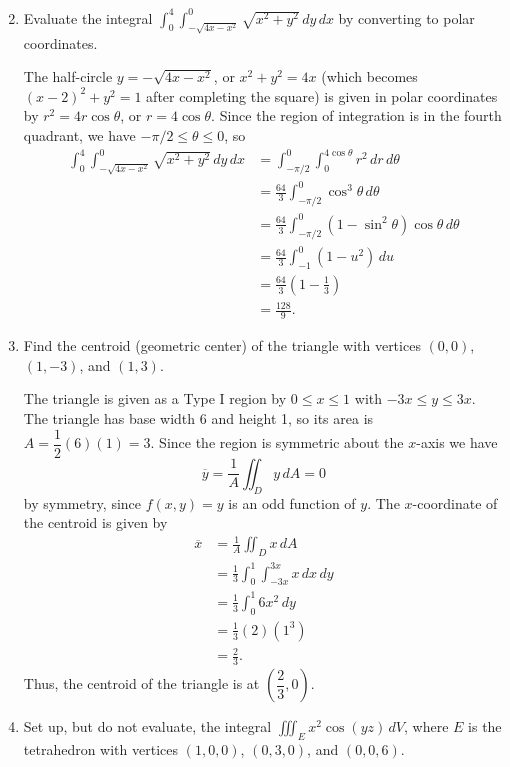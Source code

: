 \documentclass[12pt]{article}
\newcommand{\points}[1]{\marginpar{\hspace{24pt}[#1]}}
\newcommand{\di}{\displaystyle}
\begin{document}
\begin{enumerate}
\begin{multicols}{2}
\end{multicols}
\newpage
\item Evaluate the integral $\di \int_0^4\int_{-\sqrt{4x-x^2}}^0\sqrt{x^2+y^2}\,dy\,dx$ by converting to polar coordinates. \points{6}

\bigskip

The half-circle $y=-\sqrt{4x-x^2}$, or $x^2+y^2=4x$ (which becomes $(x-2)^2+y^2=1$ after completing the square) is given in polar coordinates by $r^2=4r\cos\theta$, or $r=4\cos\theta$. Since the region of integration is in the fourth quadrant, we have $-\pi/2\leq \theta\leq 0$, so
\begin{align*}
 \int_0^4\int_{-\sqrt{4x-x^2}}^0\sqrt{x^2+y^2}\,dy\,dx & = \int_{-\pi/2}^0\int_0^{4\cos\theta}r^2\,dr\,d\theta\\
& = \frac{64}{3}\int_{-\pi/2}^0\cos^3\theta\,d\theta\\
& = \frac{64}{3}\int_{-\pi/2}^0(1-\sin^2\theta)\cos\theta\,d\theta\\
& = \frac{64}{3}\int_{-1}^0(1-u^2)\,du\\
& = \frac{64}{3}\left(1-\frac{1}{3}\right)\\
& = \frac{128}{9}.
\end{align*}

\bigskip

\item Find the centroid (geometric center) of the triangle with vertices $(0,0)$, $(1,-3)$, and $(1,3)$. \points{8}

\bigskip

The triangle is given as a Type I region by $0\leq x\leq 1$ with $-3x\leq y\leq 3x$. The triangle has base width 6 and height 1, so its area is $A = \dfrac{1}{2}(6)(1) = 3$. Since the region is symmetric about the $x$-axis we have
\[
 \overline{y} = \frac{1}{A}\iint_D y\,dA = 0
\]
by symmetry, since $f(x,y)=y$ is an odd function of $y$. The $x$-coordinate of the centroid is given by
\begin{align*}
 \overline{x}& = \frac{1}{A}\iint_D x\,dA\\
& = \frac{1}{3}\int_0^1\int_{-3x}^{3x}x\,dx\,dy\\
& = \frac{1}{3}\int_0^1 6x^2\,dy\\
& = \frac{1}{3}(2)(1^3)\\
& = \frac{2}{3}.
\end{align*}
Thus, the centroid of the triangle is at $\left(\dfrac{2}{3},0\right)$.
\newpage

\item Set up, but do not evaluate, the integral $\di \iiint_E x^2\cos(yz)\,dV$, where $E$ is the tetrahedron with vertices $(1,0,0)$, $(0,3,0)$, and $(0,0,6)$. \points{6}


\end{enumerate}
\end{document}
